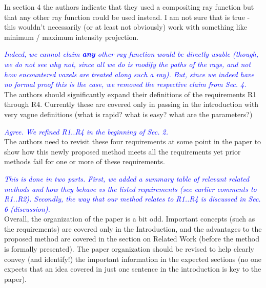 \documentclass[a4paper,10pt]{article}
\newcommand{\rr}[1]{\emph{\textcolor{blue}{#1}}}
\begin{document}
    In section 4 the authors indicate that they used a compositing ray function but
    that any other ray function could be used instead. I am not sure that is true -
    this wouldn't necessarily (or at least not obviously) work with something like
    minimum / maximum intensity projection.
    
    \rr{Indeed, we cannot claim \textbf{any} other ray function would be directly usable (though, we do not see why not, since all we do is modify the paths of the rays, and not how encountered voxels are treated along such a ray). But, since we indeed have no formal proof this is the case, we removed the respective claim from Sec. 4.}\\


    The authors should significantly expand their definitions of the requirements R1
    through R4. Currently these are covered only in passing in the introduction with
    very vague definitions (what is rapid? what is easy? what are the parameters?)
    
    \rr{Agree. We refined R1..R4 in the beginning of Sec. 2.}\\

    The authors need to revisit these four requirements at some point in the paper
    to show how this newly proposed method meets all the requirements yet prior
    methods fail for one or more of these requirements.
    
    \rr{This is done in two parts. First, we added a summary table of relevant related methods and how they behave vs the listed requirements (see earlier comments to R1..R2). Secondly, the way that our method relates to R1..R4 is discussed in Sec. 6 (discussion).}\\

    Overall, the organization of the paper is a bit odd. Important concepts (such as
    the requirements) are covered only in the Introduction, and the advantages to the
    proposed method are covered in the section on Related Work (before the method is
    formally presented).  The paper organization should be revised to help clearly
    convey (and identify!) the important information in the expected sections (no one
    expects that an idea covered in just one sentence in the introduction is key to
    the paper).
    
\end{document}

